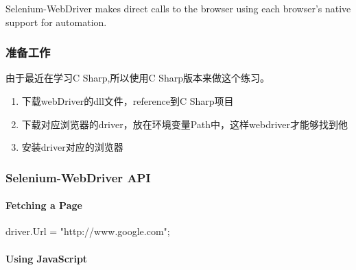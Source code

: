 Selenium-WebDriver makes direct calls to the browser using each browser’s native support for automation.

\subsubsection{准备工作}

由于最近在学习C Sharp,所以使用C Sharp版本来做这个练习。
\begin{enumerate}
\item 下载webDriver的dll文件，reference到C Sharp项目
\item 下载对应浏览器的driver，放在环境变量Path中，这样webdriver才能够找到他
\item 安装driver对应的浏览器
\end{enumerate}

\subsubsection{Selenium-WebDriver API}

\paragraph{Fetching a Page}
\begin{CSharp}
driver.Url = "http://www.google.com";
\end{CSharp}

\paragraph{Using JavaScript}